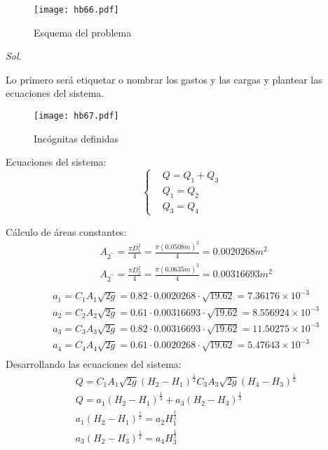     \begin{figure}[h!]
    \centering
      \texttt{[image: hb66.pdf]}
      \caption{Esquema del problema}
      \label{hb66}
    \end{figure}
    
    \textit{ Sol. }
    
    Lo primero será etiquetar o nombrar los gastos y las cargas y plantear las ecuaciones del sistema.
    
    \begin{figure}[h!]
    \centering
      \texttt{[image: hb67.pdf]}
      \caption{Incógnitas definidas}	
      \label{hb67}
    \end{figure}
    
    Ecuaciones del sistema:
    \begin{equation*}
        \begin{cases}
            &Q = Q_1 + Q_3\\
            &Q_1 =Q_2\\
            &Q_3 = Q_4 
        \end{cases}
    \end{equation*}
    
    Cálculo de áreas constantes:
    \begin{align*}
        &A_{2^{\prime\prime}}=\frac{\pi D^2_1}{4} = \frac{\pi (0.0508m)^2}{4} = 0.0020268m^2\\
        &A_{2^{\prime\prime}}=\frac{\pi D^2_2}{4} = \frac{\pi (0.0635m)^2}{4} = 0.00316693m^2\\
    \end{align*}
    \begin{align*}
        &a_1 = C_1A_1 \sqrt{2g} = 0.82\cdot 0.0020268\cdot \sqrt{19.62} =  7.36176 \times 10^{-3}\\
        &a_2 = C_2A_2 \sqrt{2g} = 0.61\cdot 0.00316693\cdot \sqrt{19.62} = 8.556924 \times 10^{-3}\\
        &a_3 = C_3A_3 \sqrt{2g} = 0.82\cdot 0.00316693\cdot \sqrt{19.62} = 11.50275 \times 10^{-3}\\
        &a_4 = C_4A_4 \sqrt{2g} = 0.61\cdot 0.0020268\cdot \sqrt{19.62} =  5.47643 \times 10^{-3}\\
    \end{align*}
    Desarrollando las ecuaciones del sistema:
    \begin{align*}
        &Q = C_1A_1 \sqrt{2g}\left(H_2 - H_1\right)^{\frac{1}{2}}C_3A_3 \sqrt{2g}\left(H_4 - H_3\right)^{\frac{1}{2}}\\
        &Q = a_1\left(H_2 - H_1\right)^{\frac{1}{2}} + a_3\left(H_2 - H_3\right)^{\frac{1}{2}}\\
        &a_1\left(H_2 - H_1\right)^{\frac{1}{2}} = a_2 H_1^{\frac{1}{2}}\\
        &a_3\left(H_2 - H_3\right)^{\frac{1}{2}} = a_4 H_3^{\frac{1}{2}}
    \end{align*}
    
